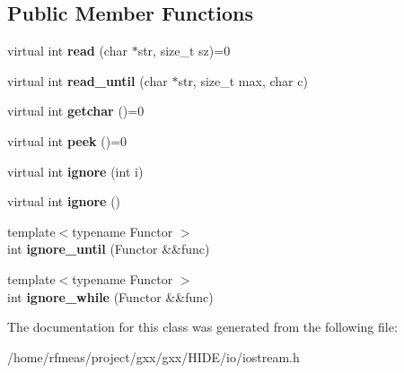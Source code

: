 \subsection*{Public Member Functions}
\begin{DoxyCompactItemize}
\item 
virtual int {\bfseries read} (char $\ast$str, size\+\_\+t sz)=0\hypertarget{classgxx_1_1istream_a36070e7f4efb9eb42514f044fbfe88b9}{}\label{classgxx_1_1istream_a36070e7f4efb9eb42514f044fbfe88b9}

\item 
virtual int {\bfseries read\+\_\+until} (char $\ast$str, size\+\_\+t max, char c)\hypertarget{classgxx_1_1istream_a1da5bb3299905a605055bd0ae8774e8b}{}\label{classgxx_1_1istream_a1da5bb3299905a605055bd0ae8774e8b}

\item 
virtual int {\bfseries getchar} ()=0\hypertarget{classgxx_1_1istream_a8cf013e3b34f7d47180432462beb0e08}{}\label{classgxx_1_1istream_a8cf013e3b34f7d47180432462beb0e08}

\item 
virtual int {\bfseries peek} ()=0\hypertarget{classgxx_1_1istream_a8c23cc3995a88e75bf0b147313c10e12}{}\label{classgxx_1_1istream_a8c23cc3995a88e75bf0b147313c10e12}

\item 
virtual int {\bfseries ignore} (int i)\hypertarget{classgxx_1_1istream_a205b1d77a6b8fc4758a601487f5ef323}{}\label{classgxx_1_1istream_a205b1d77a6b8fc4758a601487f5ef323}

\item 
virtual int {\bfseries ignore} ()\hypertarget{classgxx_1_1istream_a794daaf508035be9dd13eaee29aae587}{}\label{classgxx_1_1istream_a794daaf508035be9dd13eaee29aae587}

\item 
{\footnotesize template$<$typename Functor $>$ }\\int {\bfseries ignore\+\_\+until} (Functor \&\&func)\hypertarget{classgxx_1_1istream_ab2130ba48ef452067d3f1bc1d18e2300}{}\label{classgxx_1_1istream_ab2130ba48ef452067d3f1bc1d18e2300}

\item 
{\footnotesize template$<$typename Functor $>$ }\\int {\bfseries ignore\+\_\+while} (Functor \&\&func)\hypertarget{classgxx_1_1istream_aaf0802e9430b4db44bc0bd1eac788458}{}\label{classgxx_1_1istream_aaf0802e9430b4db44bc0bd1eac788458}

\end{DoxyCompactItemize}


The documentation for this class was generated from the following file\+:\begin{DoxyCompactItemize}
\item 
/home/rfmeas/project/gxx/gxx/\+H\+I\+D\+E/io/iostream.\+h\end{DoxyCompactItemize}
